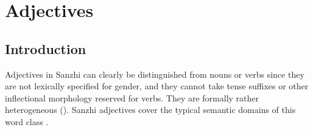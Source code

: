 \chapter{Adjectives}
\label{cpt:morph-adjectives}
\section{Introduction}
\label{sec:Other syntactic properties}

Adjectives in Sanzhi can clearly be distinguished from nouns or verbs since they are not lexically specified for gender, and they cannot take tense suffixes or other inflectional morphology reserved for verbs. They are formally rather heterogeneous ().  
Sanzhi adjectives cover the typical semantic domains of this word class .
%
